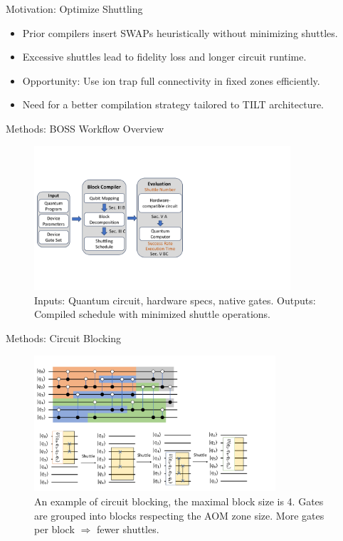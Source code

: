 \documentclass{beamer}
\begin{document}
	\begin{frame}{Motivation: Optimize Shuttling}
		\begin{itemize}
			\item Prior compilers insert SWAPs heuristically without minimizing shuttles.
			\item Excessive shuttles lead to fidelity loss and longer circuit runtime.
			\item Opportunity: Use ion trap full connectivity in fixed zones efficiently.
			\item Need for a better compilation strategy tailored to TILT architecture.
		\end{itemize}
	\end{frame}
	
	\begin{frame}{Methods: BOSS Workflow Overview}
		\begin{figure}
			\centering
			\includegraphics[width=0.85\textwidth]{figure/TILT_overview.pdf}
			\caption{Inputs: Quantum circuit, hardware specs, native gates. Outputs: Compiled schedule with minimized shuttle operations.}
		\end{figure}
	\end{frame}
	
	\begin{frame}{Methods: Circuit Blocking}
		\begin{figure}
			\centering
			\includegraphics[width=0.8\textwidth]{figure/circuit-blocking.pdf}
			\caption{An example of circuit blocking, the maximal block size is 4. Gates are grouped into blocks respecting the AOM zone size. More gates per block $\Rightarrow$ fewer shuttles.}
		\end{figure}
	\end{frame}
	
\end{document}

